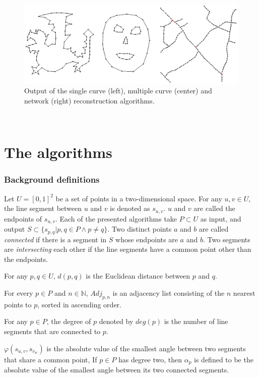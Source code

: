 \documentclass[11pt]{article}
\begin{document}
\begin{figure}[ht!]
\centering
\includegraphics[scale=0.3]{images/outputOverview.png}
\caption{Output of the single curve (left), multiple curve (center) and network (right) reconstruction algorithms.}
\label{outputOverview}
\end{figure}$ $\\


\section{The algorithms}
\label{se:algorithms}
\subsubsection{Background definitions}
Let $U = [0,1]^2$ be a set of points in a two-dimensional space.
For any $u,v \in U$, the line segment between $u$ and $v$ is denoted as $s_{u,v}$. $u$ and $v$ are called the endpoints of $s_{u,v}$. Each of the presented algorithms take $P \subset U$ as input, and output $S \subset \{s_{p,q} | p,q \in P \land p \neq q \}$.
 Two distinct points $a$ and $b$ are called \textit{connected} if there is a segment in $S$ whose endpoints are $a$ and $b$.
 Two segments are \textit{intersecting} each other if the line segments have a common point other than the endpoints.

For any $p,q \in U$, $d(p,q)$ is the Euclidean distance between $p$ and $q$. %

For every $p \in P$ and $n \in \mathbb{N}$, $Adj_{p,n}$ is an adjacency list consisting of the $n$ nearest points to $p$, sorted in ascending order.

For any $p \in P$, the degree of $p$ denoted by $deg(p)$ is the number of line segments that are connected to $p$.

$\varphi(s_{u,v}, s_{v_w})$ is the absolute value of the smallest angle between two segments that share a common point,
If $p \in P$ has degree two, then $\alpha_p$ is defined to be the absolute value of the smallest angle between its two connected segments. %
\end{document}
